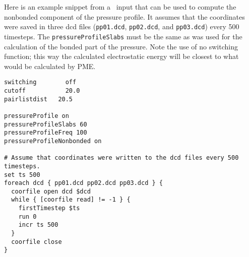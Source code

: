 Here is an example snippet from a \PDAC\ input that can be used to compute
the nonbonded component of the pressure profile.  It assumes that the 
coordinates were saved in three dcd files ({\tt pp01.dcd}, {\tt pp02.dcd},
and {\tt pp03.dcd}) every 500 timesteps.  The {\tt pressureProfileSlabs}
must be the same as was used for the calculation of the bonded part of
the pressure.  Note the use of no switching function; this way the calculated
electrostatic energy will be closest to what would be calculated by PME.
\begin{verbatim}
switching	     off
cutoff		     20.0
pairlistdist   20.5

pressureProfile	on
pressureProfileSlabs 60 
pressureProfileFreq 100 
pressureProfileNonbonded on

# Assume that coordinates were written to the dcd files every 500 timesteps.
set ts 500
foreach dcd { pp01.dcd pp02.dcd pp03.dcd } {
  coorfile open dcd $dcd
  while { [coorfile read] != -1 } {
    firstTimestep $ts 
    run 0 
    incr ts 500
  }
  coorfile close
}
\end{verbatim}

